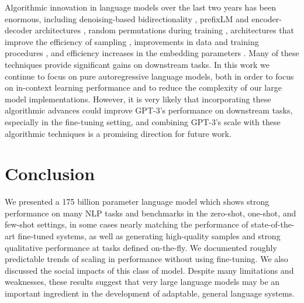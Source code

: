 Algorithmic innovation in language models over the last two years has been enormous, including denoising-based bidirectionality \cite{devlin2018bert}, prefixLM \cite{dai2015semi} and encoder-decoder architectures \cite{lewis2019bart,raffel2019t5}, random permutations during training \cite{yang2019xlnet}, architectures that improve the efficiency of sampling \cite{dai2019transformerXL}, improvements in data and training procedures \cite{liu2019roberta}, and efficiency increases in the embedding parameters \cite{lan2019albert}.  Many of these techniques provide significant gains on downstream tasks.  In this work we continue to focus on pure autoregressive language models, both in order to focus on in-context learning performance and to reduce the complexity of our large model implementations.  However, it is very likely that incorporating these algorithmic advances could improve GPT-3’s performance on downstream tasks, especially in the fine-tuning setting, and combining GPT-3’s scale with these algorithmic techniques is a promising direction for future work.

\section{Conclusion}
\label{section:Conclusion}

We presented a 175 billion parameter language model which shows strong performance on many NLP tasks and benchmarks in the zero-shot, one-shot, and few-shot settings, in some cases nearly matching the performance of state-of-the-art fine-tuned systems, as well as generating high-quality samples and strong qualitative performance at tasks defined on-the-fly.  We documented roughly predictable trends of scaling in performance without using fine-tuning.  We also discussed the social impacts of this class of model.  Despite many limitations and weaknesses, these results suggest that very large language models may be an important ingredient in the development of adaptable, general language systems.


